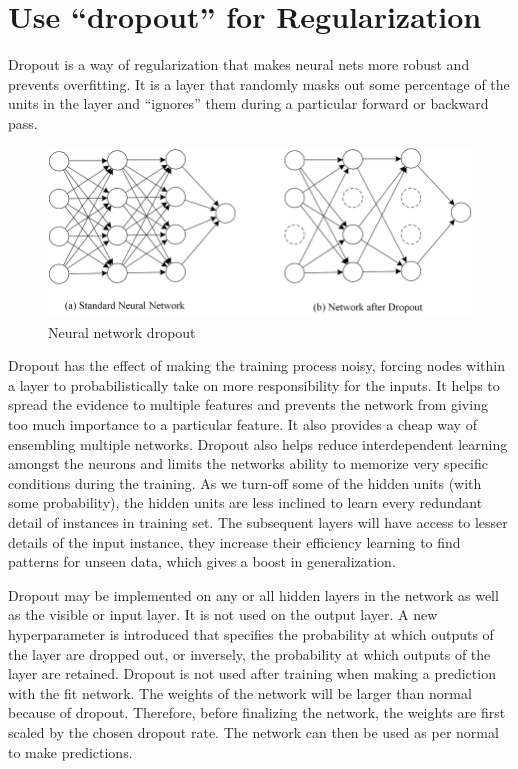 \section{Use “dropout” for Regularization}
Dropout is a way of regularization that makes neural nets more robust and prevents overfitting. 
It is a layer that randomly masks out some percentage of the units in the layer and “ignores” them during a particular forward or backward pass.

\begin{figure}[ht]
\centering
\includegraphics[width=120mm]{figs/Dropout.png}
\caption{Neural network dropout}
\label{fig:dropout}
\end{figure}

Dropout has the effect of making the training process noisy, forcing nodes within a layer to probabilistically take on more responsibility for the inputs. 
It helps to spread the evidence to multiple features and prevents the network from giving too much importance to a particular feature. 
It also provides a cheap way of ensembling multiple networks. 
Dropout also helps reduce interdependent learning amongst the neurons and limits the networks ability to memorize very specific conditions during the training. 
As we turn-off some of the hidden units (with some probability), the hidden units are less inclined to learn every redundant detail of instances in training set. 
The subsequent layers will have access to lesser details of the input instance, they increase their efficiency learning to find patterns for unseen data, which gives a boost in generalization.

Dropout may be implemented on any or all hidden layers in the network as well as the visible or input layer. It is not used on the output layer. 
A new hyperparameter is introduced that specifies the probability at which outputs of the layer are dropped out, or inversely, the probability at which outputs of the layer are retained. 
Dropout is not used after training when making a prediction with the fit network. 
The weights of the network will be larger than normal because of dropout. 
Therefore, before finalizing the network, the weights are first scaled by the chosen dropout rate. 
The network can then be used as per normal to make predictions.

